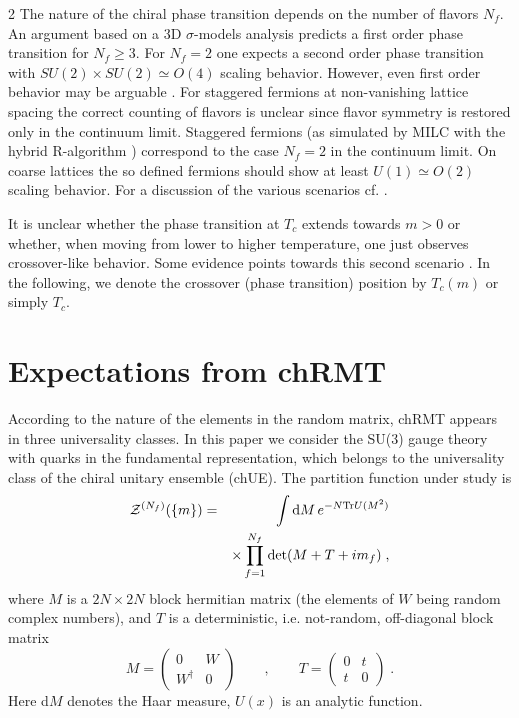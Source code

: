 \begin{multicols}{2}
The nature of the chiral phase transition depends on the number of flavors
$N_f$. An argument based on a 3D $\sigma$-models analysis \cite{PiWi84}
predicts a first order phase transition for $N_f\ge 3$.  For $N_f=2$ one  
expects a second order phase transition with $SU(2)\times SU(2)\simeq O(4)$
scaling behavior. However, even first order behavior may be arguable
\cite{Wi92,RaWi93,Ra95}. For staggered fermions at non-vanishing lattice
spacing the correct counting of flavors is unclear since flavor symmetry is
restored only in the continuum limit. Staggered fermions (as simulated by MILC
with the hybrid R-algorithm \cite{GoLiRe87}) correspond to the case $N_f=2$ in
the continuum limit.  On coarse lattices the so defined fermions should show at
least $U(1)\simeq O(2)$ scaling behavior. For a discussion of the various
scenarios cf. \cite{La98,DeTar98,BeDeGo99}.

It is unclear whether the phase transition at $T_c$ extends towards $m>0$ or
whether, when moving from lower to higher temperature, one just observes
crossover-like behavior. Some evidence points towards this second scenario
\cite{AoFuHa98,La98}. In the following, we denote the crossover (phase
transition) position by $T_c(m)$ or simply $T_c$.


\section{Expectations from chRMT}\label{SecRMT}

According to the nature of the elements in the random matrix, chRMT\space
appears in three universality classes. In this paper we consider the SU(3)
gauge theory with quarks in the fundamental representation, which belongs to
the universality class of the chiral unitary ensemble (chUE). The partition
function under study is \cite{ShVe93,JaVe96,WeScWe96}
\begin{eqnarray}
{\mathcal Z}^{(N_f)}(\{m\})&=&
\int {\rm d}M \,e^{-N{\rm Tr} U(M^2)}\nonumber\\
\label{Z}
 &&\times \prod_{f=1}^{N_f}\det(M+T+im_f) \;,
\end{eqnarray}
where $M$ is a $2N\times2N$ block hermitian matrix (the elements of $W$
being random complex numbers), and
$T$ is a deterministic, i.e. not-random, off-diagonal block matrix
\begin{equation} \label{Tmodel}
M=\left(\begin{array}{cc} 0 & W \\ W^\dagger & 0 \end{array} \right) \qquad , 
\qquad   
T=\left(\begin{array}{cc} 0 & t \\ t & 0 \end{array} \right) \; .
\end{equation}
Here d$M$ denotes the Haar measure, $U(x)$ is an analytic function.


\end{multicols}
